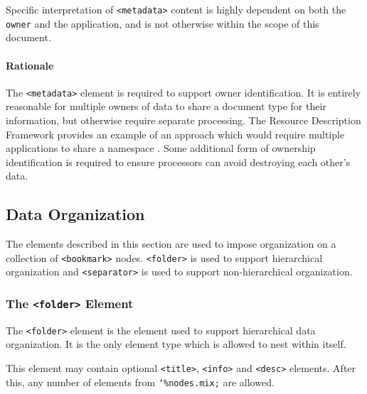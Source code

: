 \documentclass{howto}
\newcommand{\element}[1]{\texttt{<#1>}}
\newcommand{\attribute}[1]{\texttt{#1}}
\newcommand{\paramentity}[1]{\texttt{\char`\%#1;}}
\begin{document}
        Specific interpretation of \element{metadata} content is
        highly dependent on both the \attribute{owner} and the
        application, and is not otherwise within the scope of this
        document.

      \paragraph*{Rationale}
        The \element{metadata} element is required to support owner
        identification.  It is entirely reasonable for multiple owners
        of data to share a document type for their information, but
        otherwise require separate processing.  The Resource
        Description Framework provides an example of an approach which
        would require multiple applications to share a namespace
        \cite{w3c-rdf-syntax,w3c-rdf-schema}.  Some additional form of
        ownership identification is required to ensure processors can
        avoid destroying each other's data.

  \subsection{Data Organization
              \label{data-organization}}

    The elements described in this section are used to impose
    organization on a collection of \element{bookmark} nodes.
    \element{folder} is used to support hierarchical organization and
    \element{separator} is used to support non-hierarchical
    organization.

    \subsubsection{The \element{folder} Element
                   \label{element-folder}}

      The \element{folder} element is the element used to support
      hierarchical data organization.  It is the only element type
      which is allowed to nest within itself.

      This element may contain optional \element{title},
      \element{info} and \element{desc} elements.  After this, any
      number of elements from \paramentity{nodes.mix} are allowed.
\end{document}
